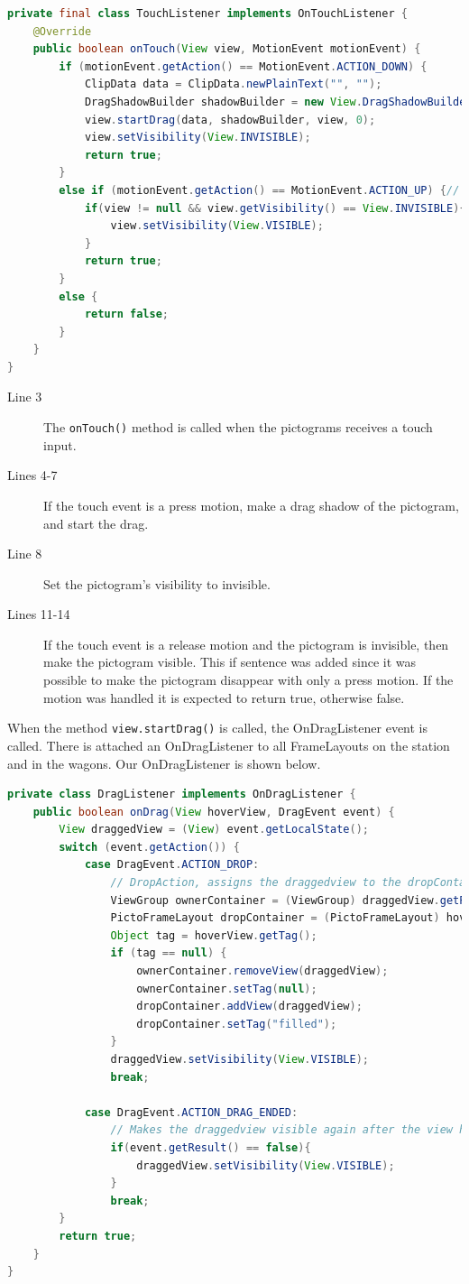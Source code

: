 \begin{lstlisting}[language=java,firstnumber=1,caption={Our TouchListener},label=lst:ourtouchlistener] 
private final class TouchListener implements OnTouchListener {
	@Override
	public boolean onTouch(View view, MotionEvent motionEvent) {
		if (motionEvent.getAction() == MotionEvent.ACTION_DOWN) {
			ClipData data = ClipData.newPlainText("", "");
			DragShadowBuilder shadowBuilder = new View.DragShadowBuilder(view);
			view.startDrag(data, shadowBuilder, view, 0);
			view.setVisibility(View.INVISIBLE);
			return true;
		}
		else if (motionEvent.getAction() == MotionEvent.ACTION_UP) {// prevents that a pictogram disappears if only pressed and no drag
			if(view != null && view.getVisibility() == View.INVISIBLE){
				view.setVisibility(View.VISIBLE);
			}
			return true;
		}
		else {
			return false;
		}
	}
}
\end{lstlisting}
\begin{description}
\item[Line 3] The \lstinline|onTouch()| method is called when the pictograms receives a touch input.
\item[Lines 4-7] If the touch event is a press motion, make a drag shadow of the pictogram, and start the drag.
\item[Line 8] Set the pictogram's visibility to invisible.
\item[Lines 11-14] If the touch event is a release motion and the pictogram is invisible, then make the pictogram visible. This if sentence was added since it was possible to make the pictogram disappear with only a press motion. If the motion was handled it is expected to return true, otherwise false.
\end{description}
When the method \lstinline|view.startDrag()| is called, the OnDragListener event is called. There is attached an OnDragListener to all FrameLayouts on the station and in the wagons. Our OnDragListener is shown below.
\begin{lstlisting}[language=java,firstnumber=1,caption={Our DragListener},label=lst:ourdraglistener] 
private class DragListener implements OnDragListener {
	public boolean onDrag(View hoverView, DragEvent event) {
	    View draggedView = (View) event.getLocalState();
		switch (event.getAction()) {
			case DragEvent.ACTION_DROP:
				// DropAction, assigns the draggedview to the dropContainer if, the dropContainer does not already contain a pictogram.
				ViewGroup ownerContainer = (ViewGroup) draggedView.getParent();
				PictoFrameLayout dropContainer = (PictoFrameLayout) hoverView;
				Object tag = hoverView.getTag();
				if (tag == null) {
					ownerContainer.removeView(draggedView);
					ownerContainer.setTag(null);
					dropContainer.addView(draggedView);
					dropContainer.setTag("filled");
				}
				draggedView.setVisibility(View.VISIBLE);
				break;

			case DragEvent.ACTION_DRAG_ENDED:
				// Makes the draggedview visible again after the view has been moved or if drop wasn't valid.
				if(event.getResult() == false){
					draggedView.setVisibility(View.VISIBLE);
				}
				break;
		}
		return true;
	}
}
\end{lstlisting}
